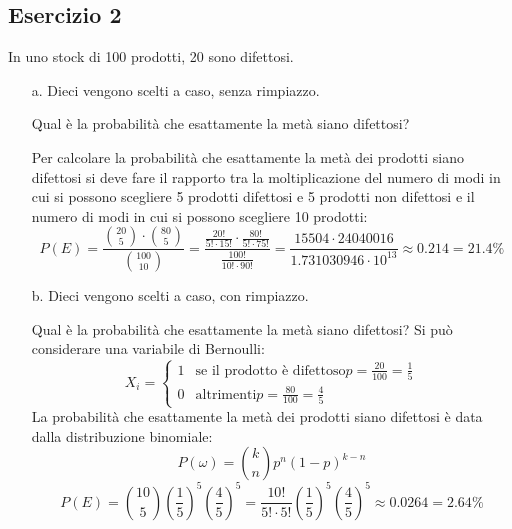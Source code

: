 \documentclass[a4paper]{article}
\theoremstyle{break}
\theoremstyle{break}
\theoremstyle{break}
\theoremstyle{break}
\begin{document}
\subsection{Esercizio 2}
In uno stock di 100 prodotti, 20 sono difettosi.
\begin{enumerate}
	\item[a.] Dieci vengono scelti a caso, senza rimpiazzo.

	      \noindent Qual è la probabilità che esattamente la metà siano difettosi?

	      \vspace{1em}
	      Per calcolare la probabilità che esattamente la metà dei prodotti siano difettosi
	      si deve fare il rapporto tra la moltiplicazione del numero di modi in cui si possono
	      scegliere 5 prodotti difettosi e 5 prodotti non difettosi e il numero di modi in
	      cui si possono scegliere 10 prodotti:
	      \[
		      P(E) = \frac{\binom{20}{5} \cdot \binom{80}{5}}{\binom{100}{10}} =
		      \frac{\frac{20!}{5! \cdot 15!}\cdot \frac{80!}{5! \cdot 75!}}{\frac{100!}{10! \cdot 90!}} =
		      \frac{15504 \cdot 24040016}{1.731030946 \cdot 10^{13}} \approx 0.214 = 21.4\%
	      \]
	\item[b.] Dieci vengono scelti a caso, con rimpiazzo.

	      \noindent Qual è la probabilità che esattamente la metà siano difettosi?
	      \vspace{1em}
	      Si può considerare una variabile di Bernoulli:
	      \[
		      X_i = \begin{cases}
			      1 & \text{se il prodotto è difettoso} p = \frac{20}{100} = \frac{1}{5} \\
			      0 & \text{altrimenti} p = \frac{80}{100} = \frac{4}{5}
		      \end{cases}
	      \]
	      La probabilità che esattamente la metà dei prodotti siano difettosi è data dalla
	      distribuzione binomiale:
	      \[
		      P(\omega) = \binom{k}{n} p^n (1-p)^{k-n}
	      \]
	      \[
		      P(E) = \binom{10}{5} \left( \frac{1}{5} \right)^5 \left( \frac{4}{5} \right)^5 =
		      \frac{10!}{5! \cdot 5!} \left( \frac{1}{5} \right)^5 \left( \frac{4}{5} \right)^5 \approx
		      0.0264 = 2.64\%
	      \]
\end{enumerate}
\end{document}
